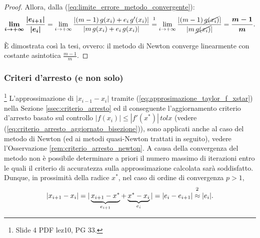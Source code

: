 \begin{proof}
	
	
	
	\noindent Allora, dalla (\ref{eq:limite_errore_metodo_convergente}):
	\begin{equation} \label{eq:newton_costante_asintotica_convergenza_lineare}
		\boldsymbol{\lim_{i\to + \infty}{\frac{|e_{i+1}|}{|e_i|}}}=\lim_{i\to + \infty}{\frac{|(m-1)\,g(x_i)+e_i\,g'(x_i)|}{|m\,g(x_i)+e_i\,g(x_i)|}}\overset{\footnotemark}{=}\lim_{i\to + \infty}{\frac{|(m-1)\,\cancel{g(x_i)}|}{|m\,\cancel{g(x_i)}|}}=\boldsymbol{\frac{m-1}{m}}.
	\end{equation}
	
	
	\noindent È dimostrata così la tesi, ovvero: il metodo di Newton converge linearmente con costante asintotica $\frac{m-1}{m}$.
\end{proof}

\subsubsection{Criteri d'arresto (e non solo)}
\footnote{Slide 4 PDF lez10, PG 33.}
L'approssimazione di $|x_{i-1}-x_i|$ tramite (\ref{eq:approsimazione_taylor_f_xstar}) nella Sezione \ref{ssec:criterio_arresto} ed il conseguente l'aggiornamento criterio d'arresto basato sul controllo $|f(x_i)|\leq|f'(x^*)|\, tolx$ (vedere (\ref{eq:criterio_arresto_aggiornato_bisezione})), sono applicati anche al caso del metodo di Newton (ed ai metodi quasi-Newton trattati in seguito), vedere l'Osservazione \ref{rem:criterio_arresto_newton}. A causa della convergenza del metodo non è possibile determinare a priori il numero massimo di iterazioni entro le quali il criterio di accuratezza sulla approssimazione calcolata sarà soddisfatto. Dunque, in prossimità della radice $x^*$, nel caso di ordine di convergenza $p>1$,
\begin{equation}\label{eq:criterio_arresto_newton}
	|x_{i+1}-x_i|=|\underbrace{x_{i+1}-x^*}_{\text{$e_{i+1}$}}+\underbrace{x^*-x_i}_{\text{$e_{i}$}}|=|e_i-e_{i+1}|\overset{\footnotemark}{\approx}|e_i|.
\end{equation}

